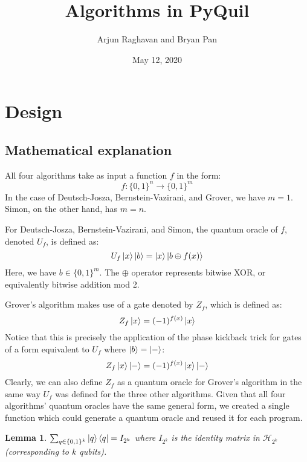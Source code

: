 \documentclass[12pt]{article}
\title{Algorithms in PyQuil}
\author{Arjun Raghavan and Bryan Pan}
\date{May 12, 2020}
\newtheorem{lemma}{Lemma}
\begin{document}
\mktitle
\startbody

\section*{}
\section{Design}

\subsection{Mathematical explanation}

All four algorithms take as input a function $f$ in the form:
\[
    f : \{0,1\}^n \to \{0,1\}^m
\]
In the case of Deutsch-Josza, Bernstein-Vazirani, and Grover, we have $m=1$.
Simon, on the other hand, has $m=n$.

For Deutsch-Josza, Bernstein-Vazirani, and Simon, the quantum oracle of $f$, denoted $U_f$, is defined as:
\[
    U_f\ket{x}\ket{b} = \ket{x}\ket{b \oplus f(x)}
\]
Here, we have $b \in \{0,1\}^m$.
The $\oplus$ operator represents bitwise XOR, or equivalently bitwise addition mod 2.

Grover's algorithm makes use of a gate denoted by $Z_f$, which is defined as:
\[
    Z_f\ket{x} = (-1)^{f(x)}\ket{x}
\]
Notice that this is precisely the application of the phase kickback trick for gates of a form equivalent to $U_f$ where $\ket{b} = \ket{-}$:
\[
    Z_f\ket{x}\ket{-} = (-1)^{f(x)}\ket{x}\ket{-}
\]
Clearly, we can also define $Z_f$ as a quantum oracle for Grover's algorithm in the same way $U_f$ was defined for the three other algorithms.
Given that all four algorithms' quantum oracles have the same general form, we created a single function which could generate a quantum oracle and reused it for each program.

\begin{lemma}
    $\sum_{q \in \{0,1\}^k}{\ket{q}\bra{q}} = I_{2^k}$ where $I_{2^k}$ is the identity matrix in $\mathcal{H}_{2^k}$ (corresponding to $k$ qubits).
\end{lemma}
\end{document}
